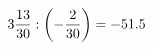 \documentclass[preview]{standalone}
\begin{document}
\begin{align*}
3 { 13 \over 30 }  :  \left( - { 2 \over 30 } \right) = -51.5
\end{align*}
\end{document}
